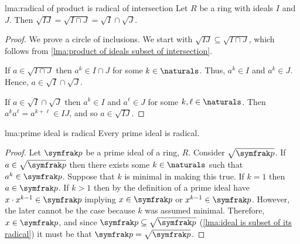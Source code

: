 \begin{lma}{}{lma:radical of product is radical of intersection}
    Let \(R\) be a ring with ideals \(I\) and \(J\).
    Then \(\sqrt{IJ} = \sqrt{I \cap J} = \sqrt{I} \cap \sqrt{J}\).
    \begin{proof}
        We prove a circle of inclusions.
        We start with \(\sqrt{IJ} \subseteq \sqrt{I \cap J}\), which follows from \cref{lma:product of ideals subset of intersection}.
        
        If \(a \in \sqrt{I \cap J}\) then \(a^k \in I \cap J\) for some \(k \in \naturals\).
        Thus, \(a^k \in I\) and \(a^k \in J\).
        Hence, \(a \in \sqrt{I} \cap \sqrt{J}\).
        
        If \(a \in \sqrt{I} \cap \sqrt{J}\) then \(a^k \in I\) and \(a^{\ell} \in J\) for some \(k, \ell \in \naturals\).
        Then \(a^k a^{\ell} = a^{k + \ell} \in IJ\), and so \(a \in \sqrt{IJ}\).
    \end{proof}
\end{lma}

\begin{lma}{}{lma:prime ideal is radical}
    Every prime ideal is radical.
    \begin{proof}
        Let \(\ideal{p}\) be a prime ideal of a ring, \(R\).
        Consider \(\sqrt{\ideal{p}}\).
        If \(a \in \sqrt{\ideal{p}}\) then there exists some \(k \in \naturals\) such that \(a^k \in \ideal{p}\).
        Suppose that \(k\) is minimal in making this true.
        If \(k = 1\) then \(a \in \ideal{p}\).
        If \(k > 1\) then by the definition of a prime ideal have \(x \cdot x^{k-1} \in \ideal{p}\) implying \(x \in \ideal{p}\) or \(x^{k-1} \in \ideal{p}\).
        However, the later cannot be the case because \(k\) was assumed minimal.
        Therefore, \(x \in \ideal{p}\), and since \(\ideal{p} \subseteq \sqrt{\ideal{p}}\) (\cref{lma:ideal is subset of its radical}) it must be that \(\ideal{p} = \sqrt{\ideal{p}}\).
    \end{proof}
\end{lma}

